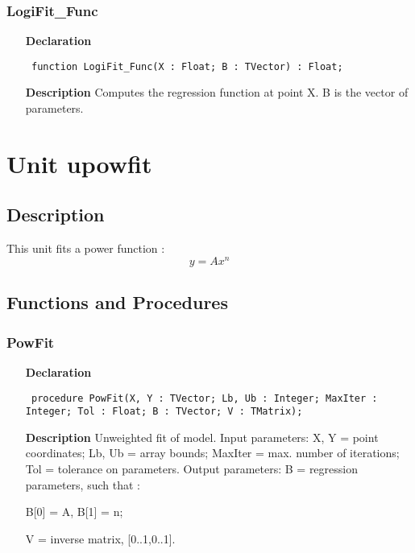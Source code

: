 \documentclass[12pt,a4paper,oneside]{report}
\newcommand{\declarationitem}[1]{\textbf{#1}}
\newcommand{\descriptiontitle}[1]{\textbf{#1}}
\newcommand{\code}[1]{\texttt{#1}}
\begin{document}
\subsubsection{LogiFit{\_}Func}
\label{ulogifit-LogiFit_Func}
\begin{itemize}\item[\declarationitem{Declaration}\hfill]
	\begin{flushleft}
		\code{
			function LogiFit{\_}Func(X : Float; B : TVector) : Float;}
		
	\end{flushleft}
	
	\par
	\item[\descriptiontitle{Description}]
	Computes the regression function at point X. B is the vector of parameters.
	
\end{itemize}


\section{Unit upowfit}
\label{upowfit}
\subsection{Description}
This unit fits a power function :
$$
y = A x^n
$$

\subsection{Functions and Procedures}
\subsubsection{PowFit}
\label{upowfit-PowFit}
\begin{itemize}\item[\declarationitem{Declaration}\hfill]
	\begin{flushleft}
		\code{
			procedure PowFit(X, Y : TVector; Lb, Ub : Integer; MaxIter : Integer; Tol : Float; B : TVector; V : TMatrix);}
		
	\end{flushleft}
	
	\par
	\item[\descriptiontitle{Description}]
	Unweighted fit of model. Input parameters: X, Y = point coordinates; Lb, Ub = array bounds; MaxIter = max. number of iterations; Tol = tolerance on parameters. Output parameters: B = regression parameters, such that :
	
	B[0] = A, B[1] = n; 
	
	V = inverse matrix, [0..1,0..1].
	
\end{itemize}
\end{document}
